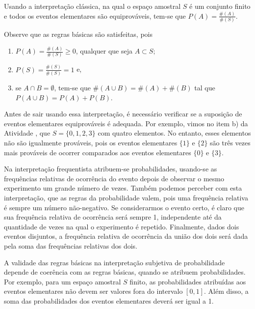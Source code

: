\begin{observation}{ }

 Usando a interpretação clássica, na qual o espaço amostral \(S\) é um conjunto finito e todos os eventos elementares são equiprováveis, tem-se que \(P(A)=\frac{\#(A)}{\#(S)}\).

Observe que as regras básicas são satisfeitas, pois
\begin{enumerate}
\item {} 
\(P(A)=\frac{\#(A)}{\#(S)}\geq 0\), qualquer que seja \(A \subset S\);

\item {} 
\(P(S)=\frac{\#(S)}{\#(S)}=1\) e,

\item {} 
se \(A\cap B=\emptyset\), tem-se que \(\#(A\cup B)=\#(A)+\#(B)\) tal que \(P(A\cup B)=P(A)+P(B)\).

\end{enumerate}

 Antes de sair usando essa interpretação, é necessário verificar se a suposição de eventos elementares equiprováveis é adequada. Por exemplo, vimos no item b) da Atividade , que \(S=\{0,1,2,3\}\) com quatro elementos. No entanto, esses elementos não são igualmente prováveis, pois os eventos elementares \(\{1\}\) e \(\{ 2\}\) são três vezes mais prováveis de ocorrer comparados aos eventos elementares \(\{0\}\) e \(\{3\}\).
\end{observation}


Na interpretação frequentista atribuem-se probabilidades, usando-se as frequências relativas de ocorrência do evento depois de observar o mesmo experimento um grande número de vezes. Também podemos perceber com esta interpretação, que as regras da probabilidade valem, pois uma frequência relativa é sempre um número não-negativo. Se considerarmos o evento certo, é claro que sua frequência relativa de ocorrência será sempre 1, independente até da quantidade de vezes na qual o experimento é repetido. Finalmente, dados dois eventos disjuntos, a frequência relativa de ocorrência da união dos dois será dada pela soma das frequências relativas dos dois.


A validade das regras básicas na interpretação subjetiva de probabilidade depende de coerência com as regras básicas, quando se atribuem probabilidades. Por exemplo, para um espaço amostral \(S\) finito, as probabilidades atribuídas aos eventos elementares não devem ser valores fora do intervalo \([0,1]\). Além disso, a soma das probabilidades dos eventos elementares deverá ser igual a 1.


